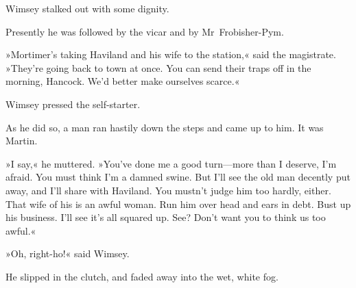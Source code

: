 Wimsey stalked out with some dignity.

Presently he was followed by the vicar and by Mr~Frobisher-Pym.

»Mortimer's taking Haviland and his wife to the station,« said the magistrate. »They're going back to town at once. You can send their traps off in the morning, Hancock. We'd better make ourselves scarce.«

Wimsey pressed the self-starter.

As he did so, a man ran hastily down the steps and came up to him. It was Martin.

»I say,« he muttered. »You've done me a good turn—more than I deserve, I'm afraid. You must think I'm a damned swine. But I'll see the old man decently put away, and I'll share with Haviland. You mustn't judge him too hardly, either. That wife of his is an awful woman. Run him over head and ears in debt. Bust up his business. I'll see it's all squared up. See? Don't want you to think us too awful.«

»Oh, right-ho!« said Wimsey.

He slipped in the clutch, and faded away into the wet, white fog.